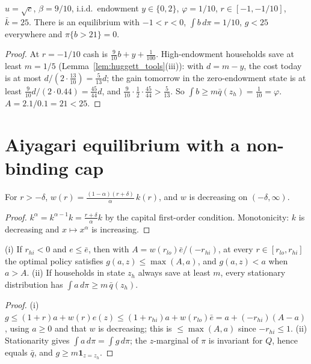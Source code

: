 \begin{theorem}
\label{thm:huggett_example}
\leanok
{}
$u=\sqrt c$, $\beta = 9/10$, i.i.d.\ endowment $y\in\{0,2\}$, $\varphi = 1/10$, $r\in[-1,-1/10]$, $\bar k = 25$.
There is an equilibrium with $-1<r<0$, $\int b\,d\pi = 1/10$, $g<25$ everywhere and $\pi\{b>21\}=0$.
\end{theorem}
\begin{proof}
\leanok
{}
At $r=-1/10$ cash is $\tfrac9{10}b + y + \tfrac1{100}$. High-endowment households save at least $m = 1/5$
(Lemma~\ref{lem:huggett_tools}(iii)): with $d = m - y$, the cost today is at most $d/(2\cdot\tfrac{13}{10}) = \tfrac5{13}d$;
the gain tomorrow in the zero-endowment state is at least $\tfrac9{10}d/(2\cdot0.44) = \tfrac{45}{44}d$, and
$\tfrac9{10}\cdot\tfrac12\cdot\tfrac{45}{44} > \tfrac5{13}$. So $\int b\ge m\bar q(z_h) = \tfrac1{10} = \varphi$.
$A = 2.1/0.1 = 21 < 25$.
\end{proof}

\section{Aiyagari equilibrium with a non-binding cap}
\label{sec:aiyagari_slack}

\begin{lemma}
\label{lem:cd_wage_k}
\leanok
{}
For $r>-\delta$, $w(r) = \frac{(1-\alpha)(r+\delta)}{\alpha}\,k(r)$, and $w$ is decreasing on $(-\delta,\infty)$.
\end{lemma}
\begin{proof}
\leanok
$k^\alpha = k^{\alpha-1}k = \frac{r+\delta}{\alpha}k$ by the capital first-order condition. Monotonicity: $k$ is
decreasing and $x\mapsto x^\alpha$ is increasing.
\end{proof}

\begin{lemma}
\label{lem:aiyagari_slack_tools}
\leanok
{}
(i) If $r_{hi}<0$ and $e\le\bar e$, then with $A = w(r_{lo})\bar e/(-r_{hi})$, at every $r\in[r_{lo},r_{hi}]$ the
optimal policy satisfies $g(a,z)\le\max(A,a)$, and $g(a,z)<a$ when $a>A$.
(ii) If households in state $z_h$ always save at least $m$, every stationary distribution has
$\int a\,d\pi\ge m\,\bar q(z_h)$.
\end{lemma}
\begin{proof}
\leanok
(i) $g\le(1+r)a + w(r)e(z)\le(1+r_{hi})a + w(r_{lo})\bar e = a + (-r_{hi})(A-a)$, using $a\ge0$ and that $w$ is
decreasing; this is $\le\max(A,a)$ since $-r_{hi}\le 1$. (ii) Stationarity gives $\int a\,d\pi = \int g\,d\pi$; the
$z$-marginal of $\pi$ is invariant for $Q$, hence equals $\bar q$, and $g\ge m\mathbf 1_{z=z_h}$.
\end{proof}

